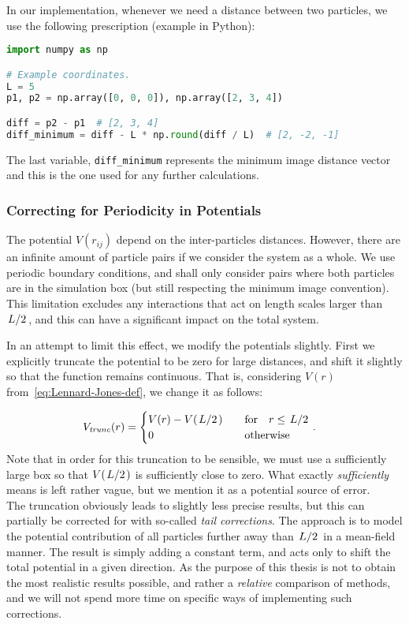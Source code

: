 \documentclass[Thesis.tex]{subfiles}
\begin{document}
In our implementation, whenever we need a distance between two particles, we use
the following prescription (example in Python):

\begin{lstlisting}[language=Python]
import numpy as np

# Example coordinates.
L = 5
p1, p2 = np.array([0, 0, 0]), np.array([2, 3, 4])

diff = p2 - p1  # [2, 3, 4]
diff_minimum = diff - L * np.round(diff / L)  # [2, -2, -1]
\end{lstlisting}
The last variable, \texttt{diff\_minimum} represents the minimum image distance
vector and this is the one used for any further calculations.

\subsubsection{Correcting for Periodicity in Potentials}

The potential $V(r_{ij})$ depend on the inter-particles distances. However,
there are an infinite amount of particle pairs if we consider the system as a
whole. We use periodic boundary conditions, and shall only consider pairs where
both particles are in the simulation box (but still respecting the minimum image
convention). This limitation excludes any interactions that act on length scales
larger than $\flatfrac{L}{2}$, and this can have a significant impact on the
total system.

In an attempt to limit this effect, we modify the potentials slightly. First we
explicitly truncate the potential to be zero for large distances, and shift it
slightly so that the function remains continuous. That is, considering $V(r)$
from~\cref{eq:Lennard-Jones-def}, we change it as follows:

\begin{align}
  \label{eq:Lennard-Jones-truncated-def}
  V_\mathit{trunc}(r) &=
                          \begin{cases}
                            V(r) - V(\flatfrac{L}{2}) & \qfor r \leq \flatfrac{L}{2}\\
                            0 & \qotherwise
                          \end{cases}.
\end{align}
Note that in order for this truncation to be sensible, we must use a
sufficiently large box so that $V(\flatfrac{L}{2})$ is sufficiently close to
zero. What exactly \emph{sufficiently} means is left rather vague, but we
mention it as a potential source of error.\\

The truncation obviously leads to slightly less precise results, but this can
partially be corrected for with so-called \emph{tail corrections}. The approach
is to model the potential contribution of all particles further away than
$\flatfrac{L}{2}$ in a mean-field manner. The result is simply adding a constant
term, and acts only to shift the total potential in a given direction. As the
purpose of this thesis is not to obtain the most realistic results possible, and
rather a \emph{relative} comparison of methods, and we will not spend more time on
specific ways of implementing such corrections.
\end{document}
